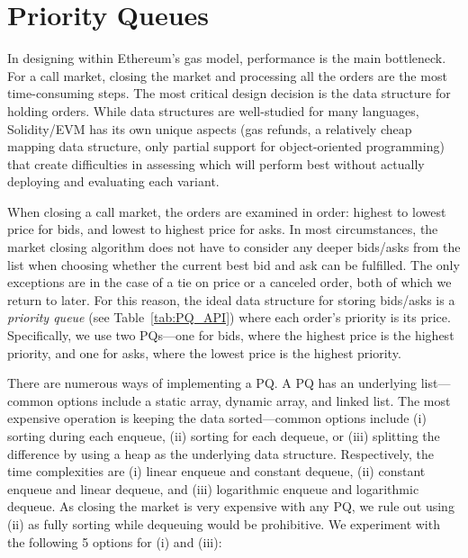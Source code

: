 \section{Priority Queues}\label{sec:pq}



In designing \cm within Ethereum's gas model, performance is the main bottleneck. For a call market, closing the market and processing all the orders are the most time-consuming steps. The most critical design decision is the data structure for holding orders. While data structures are well-studied for many languages, Solidity/EVM has its own unique aspects (\eg gas refunds, a relatively cheap mapping data structure, only partial support for object-oriented programming) that create difficulties in assessing which will perform best without actually deploying and evaluating each variant. 

When closing a call market, the orders are examined in order: highest to lowest price for bids, and lowest to highest price for asks. In most circumstances, the market closing algorithm does not have to consider any deeper bids/asks from the list when choosing whether the current best bid and ask can be fulfilled. The only exceptions are in the case of a tie on price or a canceled order, both of which we return to later. For this reason, the ideal data structure for storing bids/asks is a \textit{priority queue} (see Table~\ref{tab:PQ_API}) where each order's priority is its price. Specifically, we use two PQs---one for bids, where the highest price is the highest priority, and one for asks, where the lowest price is the highest priority. 

There are numerous ways of implementing a PQ. A PQ has an underlying list---common options include a static array, dynamic array, and linked list. The most expensive operation is keeping the data sorted---common options include (i) sorting during each enqueue, (ii) sorting for each dequeue, or (iii) splitting the difference by using a heap as the underlying data structure. Respectively, the time complexities are (i) linear enqueue and constant dequeue, (ii) constant enqueue and linear dequeue, and (iii) logarithmic enqueue and logarithmic dequeue. As closing the market is very expensive with any PQ, we rule out using (ii) as fully sorting while dequeuing would be prohibitive. We experiment with the following 5 options for (i) and (iii):

